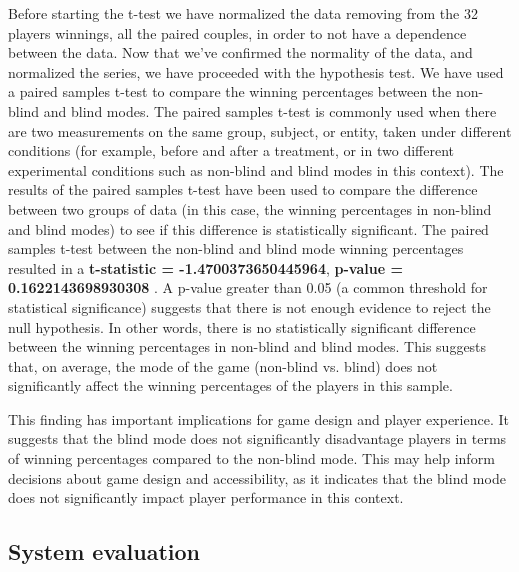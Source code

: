 \documentclass[11pt,a4paper]{report}
\begin{document}
\noindent Before starting the t-test we have normalized the data removing from the 32 players winnings, all the paired couples, in order to not have a dependence between the data.
Now that we've confirmed the normality of the data, and normalized the series, we have proceeded with the hypothesis test. We have used a paired samples t-test to compare the winning percentages between the non-blind and blind modes. The paired samples t-test is commonly used when there are two measurements on the same group, subject, or entity, taken under different conditions (for example, before and after a treatment, or in two different experimental conditions such as non-blind and blind modes in this context).
The results of the paired samples t-test have been used to compare the difference between two groups of data (in this case, the winning percentages in non-blind and blind modes) to see if this difference is statistically significant. 
The paired samples t-test between the non-blind and blind mode winning percentages resulted in a \textbf{t-statistic = -1.4700373650445964}, \textbf{p-value = 0.1622143698930308} .
A p-value greater than 0.05 (a common threshold for statistical significance) suggests that there is not enough evidence to reject the null hypothesis. In other words, there is no statistically significant difference between the winning percentages in non-blind and blind modes. This suggests that, on average, the mode of the game (non-blind vs. blind) does not significantly affect the winning percentages of the players in this sample.

\noindent This finding has important implications for game design and player experience. It suggests that the blind mode does not significantly disadvantage players in terms of winning percentages compared to the non-blind mode. This may help inform decisions about game design and accessibility, as it indicates that the blind mode does not significantly impact player performance in this context.

\subsection*{System evaluation}
\end{document}
